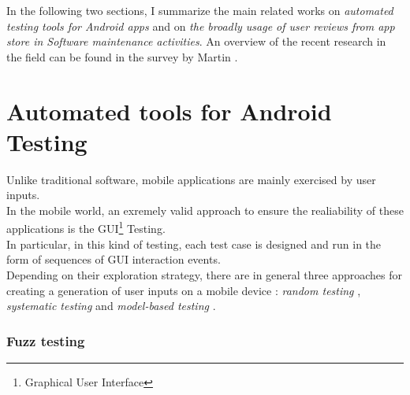 In the following two sections, I summarize the main related works on \textit{automated testing tools for Android apps} and on \textit{the broadly usage of user reviews from app store in Software maintenance activities}. 
An overview of the recent research in the field can be found in the survey by Martin \etal \cite{Martin:tse2017}. 
\section{Automated tools for Android Testing}

Unlike traditional software, mobile applications are mainly exercised by user inputs. \\ 
In the mobile world, an exremely valid approach to ensure the realiability of these applications is the GUI\footnote{Graphical User Interface} Testing. \\ 
In particular, in this kind of testing, each test case is designed and run in the form of sequences of GUI interaction events.  \\
Depending on their exploration strategy, there are in general three approaches for creating a generation of user inputs on a mobile device \cite{dynodroid, areWeThereYet}: \textit{random testing} \cite{dynodroid, monkey}, \textit{systematic testing} \cite{evodroid} and \textit{model-based testing} \cite{mobiguitar, guidedgui, mining}. 
\subsubsection{Fuzz testing}

